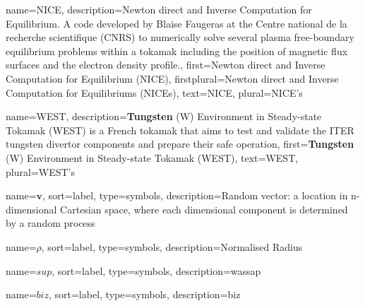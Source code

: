 {%
  name={NICE},%
  description={Newton direct and Inverse Computation for Equilibrium. A code developed by Blaise Faugeras at the Centre national de la recherche scientifique (CNRS) to numerically solve several plasma free-boundary equilibrium problems within a tokamak including the position of magnetic flux surfaces and the electron density profile.},%
  first={Newton direct and Inverse Computation for Equilibrium (NICE)},%
  firstplural={Newton direct and Inverse Computation for Equilibriums (NICEs)},%
  text={NICE},%
  plural={NICE's}%
}

{%
  name={WEST},%
  description={\textbf{Tungsten} (W) Environment in Steady-state Tokamak (WEST) is a French tokamak that aims to test and validate the ITER tungsten divertor components and prepare their safe operation},%
  first={\textbf{Tungsten} (W) Environment in Steady-state Tokamak (WEST)},%
  text={WEST},%
  plural={WEST's}%
}


{
name={$\mathbf{v}$},
sort={label},
type=symbols,
description={Random vector: a location in n-dimensional Cartesian space, where each dimensional component is determined by a random process}
}

{
name={$\rho$},
sort={label},
type=symbols,
description={Normalised Radius}
}

{
name={$sup$},
sort={label},
type=symbols,
description={wassap}
}

{
name={$biz$},
sort={label},
type=symbols,
description={biz}
}
